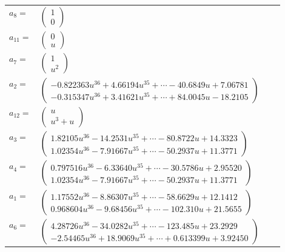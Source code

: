 \documentclass[1p]{elsarticle_modified}
\theoremstyle{definition}
\begin{document}
\begin{tabular}{m{7pt} m{180pt} m{7pt} m{180pt} }
\flushright $a_{8}=$&$\begin{pmatrix}1\\0\end{pmatrix}$ \\
\flushright $a_{11}=$&$\begin{pmatrix}0\\u\end{pmatrix}$ \\
\flushright $a_{7}=$&$\begin{pmatrix}1\\u^2\end{pmatrix}$ \\
\flushright $a_{2}=$&$\begin{pmatrix}-0.822363 u^{36}+4.66194 u^{35}+\cdots-40.6849 u+7.06781\\-0.315347 u^{36}+3.41621 u^{35}+\cdots+84.0045 u-18.2105\end{pmatrix}$ \\
\flushright $a_{12}=$&$\begin{pmatrix}u\\u^3+u\end{pmatrix}$ \\
\flushright $a_{3}=$&$\begin{pmatrix}1.82105 u^{36}-14.2531 u^{35}+\cdots-80.8722 u+14.3323\\1.02354 u^{36}-7.91667 u^{35}+\cdots-50.2937 u+11.3771\end{pmatrix}$ \\
\flushright $a_{4}=$&$\begin{pmatrix}0.797516 u^{36}-6.33640 u^{35}+\cdots-30.5786 u+2.95520\\1.02354 u^{36}-7.91667 u^{35}+\cdots-50.2937 u+11.3771\end{pmatrix}$ \\
\flushright $a_{1}=$&$\begin{pmatrix}1.17552 u^{36}-8.86307 u^{35}+\cdots-58.6629 u+12.1412\\0.968604 u^{36}-9.68456 u^{35}+\cdots-102.310 u+21.5655\end{pmatrix}$ \\
\flushright $a_{6}=$&$\begin{pmatrix}4.28726 u^{36}-34.0282 u^{35}+\cdots-123.485 u+23.2929\\-2.54465 u^{36}+18.9069 u^{35}+\cdots+0.613399 u+3.92450\end{pmatrix}$ \\

\end{tabular}
\end{document}
